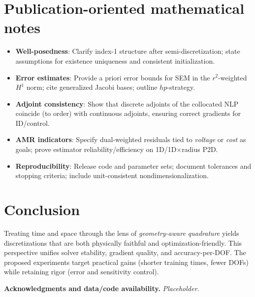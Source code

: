 \documentclass[11pt]{article}
\begin{document}
\section{Publication-oriented mathematical notes}
\begin{itemize}
\item \textbf{Well-posedness}: Clarify index-1 structure after semi-discretization; state assumptions for existence
uniqueness and consistent initialization.
\item \textbf{Error estimates}: Provide a priori error bounds for SEM in the $r^2$-weighted $H^1$ norm; cite
generalized Jacobi bases; outline $hp$-strategy.
\item \textbf{Adjoint consistency}: Show that discrete adjoints of the collocated NLP coincide (to order) with
continuous adjoints, ensuring correct gradients for ID/control.
\item \textbf{AMR indicators}: Specify dual-weighted residuals tied to \emph{voltage} or \emph{cost} as goals; prove
estimator reliability/efficiency on 1D/1D$\times$radius P2D.
\item \textbf{Reproducibility}: Release code and parameter sets; document tolerances and stopping criteria; include
unit-consistent nondimensionalization.
\end{itemize}

\section{Conclusion}
Treating time and space through the lens of \emph{geometry-aware quadrature} yields discretizations that are both
physically faithful and optimization-friendly. This perspective unifies solver stability, gradient quality, and
accuracy-per-DOF. The proposed experiments target practical gains (shorter training times, fewer DOFs) while retaining
rigor (error and sensitivity control).

\bigskip
\noindent\textbf{Acknowledgments and data/code availability.} \emph{Placeholder.}
\end{document}

